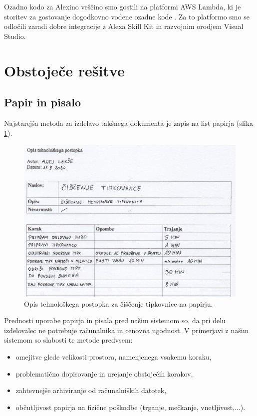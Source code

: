 \documentclass[a4paper, 12pt]{book}
\begin{document}
Ozadno kodo za Alexino veščino smo gostili na platformi AWS Lambda, ki je storitev za gostovanje dogodkovno vodene ozadne kode \cite{lambda}.
Za to platformo smo se odločili zaradi dobre integracije z Alexa Skill Kit in razvojnim orodjem Visual Studio.


\section{Obstoječe rešitve}

\subsection{Papir in pisalo}

Najstarejša metoda za izdelavo takšnega dokumenta je zapis na list papirja (slika \ref{paper}).

\begin{figure}[H]
\begin{center}
\includegraphics[width=13.5cm]{report_paper_small}
\end{center}
\caption{Opis tehnološkega postopka za čiščenje tipkovnice na papirju.}
\label{paper}
\end{figure}


Prednosti uporabe papirja in pisala pred našim sistemom so, da pri delu izdelovalec ne potrebuje računalnika in cenovna ugodnost.
V primerjavi z našim sistemom so slabosti te metode predvsem:
\begin{itemize}
	\item omejitve glede velikosti prostora, namenjenega vsakemu koraku,
	\item problematično dopisovanje in urejanje obstoječih korakov,
	\item zahtevnejše arhiviranje od računalniških datotek,
	\item občutljivost papirja na fizične poškodbe (trganje, mečkanje, vnetljivost,...).
\end{itemize}
\end{document}
